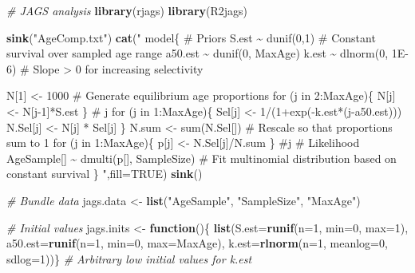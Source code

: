 \documentclass[
]{krantz}
\makeatletter
\newenvironment{Shaded}{\begin{snugshade}}{\end{snugshade}}
\newcommand{\AttributeTok}[1]{\textcolor[rgb]{0.27,0.27,0.27}{#1}}
\newcommand{\CommentTok}[1]{\textcolor[rgb]{0.37,0.37,0.37}{\textit{#1}}}
\newcommand{\ConstantTok}[1]{\textcolor[rgb]{0.37,0.37,0.37}{#1}}
\newcommand{\ControlFlowTok}[1]{\textcolor[rgb]{0.27,0.27,0.27}{\textbf{#1}}}
\newcommand{\DecValTok}[1]{\textcolor[rgb]{0.06,0.06,0.06}{#1}}
\newcommand{\FunctionTok}[1]{\textcolor[rgb]{0.27,0.27,0.27}{\textbf{#1}}}
\newcommand{\NormalTok}[1]{#1}
\newcommand{\OtherTok}[1]{\textcolor[rgb]{0.37,0.37,0.37}{#1}}
\newcommand{\StringTok}[1]{\textcolor[rgb]{0.5,0.5,0.5}{#1}}
\newenvironment{kframe}{%
\medskip{}
\setlength{\fboxsep}{.8em}
 \def\at@end@of@kframe{}%
 \ifinner\ifhmode%
  \def\at@end@of@kframe{\end{minipage}}%
  \begin{minipage}{\columnwidth}%
 \fi\fi%
 \def\FrameCommand##1{\hskip\@totalleftmargin \hskip-\fboxsep
 \colorbox{shadecolor}{##1}\hskip-\fboxsep
     \hskip-\linewidth \hskip-\@totalleftmargin \hskip\columnwidth}%
 \MakeFramed {\advance\hsize-\width
   \@totalleftmargin\z@ \linewidth\hsize
   \@setminipage}}%
 {\par\unskip\endMakeFramed%
 \at@end@of@kframe}
\renewenvironment{Shaded}{\begin{kframe}}{\end{kframe}}
\makeatother
\begin{document}
\begin{Shaded}
\begin{Highlighting}[]
\CommentTok{\# JAGS analysis}
\FunctionTok{library}\NormalTok{(rjags)}
\FunctionTok{library}\NormalTok{(R2jags)}

\FunctionTok{sink}\NormalTok{(}\StringTok{"AgeComp.txt"}\NormalTok{)}
\FunctionTok{cat}\NormalTok{(}\StringTok{"}
\StringTok{model\{}
\StringTok{    \# Priors}
\StringTok{    S.est \textasciitilde{} dunif(0,1)  \# Constant survival over sampled age range}
\StringTok{    a50.est \textasciitilde{} dunif(0, MaxAge)}
\StringTok{    k.est \textasciitilde{} dlnorm(0, 1E{-}6) \# Slope \textgreater{} 0 for increasing selectivity}

\StringTok{    N[1] \textless{}{-} 1000}
\StringTok{    \# Generate equilibrium age proportions}
\StringTok{    for (j in 2:MaxAge)\{}
\StringTok{      N[j] \textless{}{-} N[j{-}1]*S.est}
\StringTok{    \} \# j}
\StringTok{    for (j in 1:MaxAge)\{}
\StringTok{    Sel[j] \textless{}{-} 1/(1+exp({-}k.est*(j{-}a50.est)))}
\StringTok{     N.Sel[j] \textless{}{-} N[j] * Sel[j]}
\StringTok{    \}}
\StringTok{    N.sum \textless{}{-} sum(N.Sel[]) \# Rescale so that proportions sum to 1}
\StringTok{    for (j in 1:MaxAge)\{}
\StringTok{    p[j] \textless{}{-} N.Sel[j]/N.sum}
\StringTok{    \} \#j}
\StringTok{    \# Likelihood}
\StringTok{    AgeSample[] \textasciitilde{} dmulti(p[], SampleSize)  }
\StringTok{    \# Fit multinomial distribution based on constant survival}
\StringTok{\}}
\StringTok{    "}\NormalTok{,}\AttributeTok{fill=}\ConstantTok{TRUE}\NormalTok{)}
\FunctionTok{sink}\NormalTok{()}

\CommentTok{\# Bundle data}
\NormalTok{jags.data }\OtherTok{\textless{}{-}} \FunctionTok{list}\NormalTok{(}\StringTok{"AgeSample"}\NormalTok{, }\StringTok{"SampleSize"}\NormalTok{, }\StringTok{"MaxAge"}\NormalTok{)}

\CommentTok{\# Initial values}
\NormalTok{jags.inits }\OtherTok{\textless{}{-}} \ControlFlowTok{function}\NormalTok{()\{ }\FunctionTok{list}\NormalTok{(}\AttributeTok{S.est=}\FunctionTok{runif}\NormalTok{(}\AttributeTok{n=}\DecValTok{1}\NormalTok{, }\AttributeTok{min=}\DecValTok{0}\NormalTok{, }\AttributeTok{max=}\DecValTok{1}\NormalTok{),}
                               \AttributeTok{a50.est=}\FunctionTok{runif}\NormalTok{(}\AttributeTok{n=}\DecValTok{1}\NormalTok{, }\AttributeTok{min=}\DecValTok{0}\NormalTok{, }\AttributeTok{max=}\NormalTok{MaxAge),}
                               \AttributeTok{k.est=}\FunctionTok{rlnorm}\NormalTok{(}\AttributeTok{n=}\DecValTok{1}\NormalTok{, }\AttributeTok{meanlog=}\DecValTok{0}\NormalTok{, }\AttributeTok{sdlog=}\DecValTok{1}\NormalTok{))\}}
                               \CommentTok{\# Arbitrary low initial values for k.est}


\end{Highlighting}
\end{Shaded}
\end{document}
